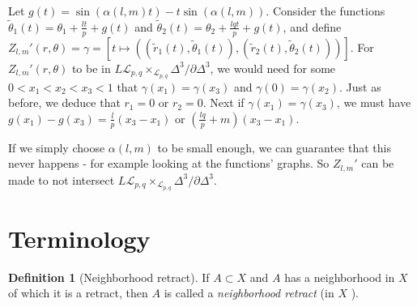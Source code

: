 \documentclass[reqno]{amsart}
\theoremstyle{definition}
\newtheorem{definition}[theorem]{Definition}
\theoremstyle{remark}
\begin{document}
    
    Let $g(t) = \sin\left( \alpha(l,m) t \right) -
    t \sin(\alpha(l,m))$.
    Consider the functions
    $\tilde{\theta}_1(t) =  
    \theta_1 + \frac{lt}{p}  + g(t)$ and
    $\tilde{\theta}_2 (t) = 
    \theta_2 + \frac{lqt}{p} + 
    g(t)$, and
    define $Z_{l,m}'(r, \theta) = 
    \gamma = 
    \left[ t\mapsto \left( \left( \tilde{r}_1(t), \tilde{\theta}_1 (t) \right) , 
    \left( \tilde{r}_2 (t) , \tilde{\theta}_2 (t) \right) \right) \right] $.
    For $Z_{l,m}'(r, \theta)$ to be in
    $L \mathcal{L}_{p,q} \times_{\mathcal{L}_{p,q}}
    \Delta^3 / \partial \Delta^3$, we would need
    for some $0 < x_1 < x_2 < x_3 < 1$ that
    $\gamma(x_1) = \gamma(x_3)$ and
    $\gamma(0) = \gamma(x_2)$. Just as before,
    we deduce that
    $r_1 = 0$ or $r_2 = 0$.
    Next if 
    $\gamma(x_1) = \gamma(x_3)$, we must have
    $g(x_1) - g(x_3) = 
    \frac{l}{p}(x_3- x_1)$ or
    $(\frac{lq}{p} + m)(x_3-x_1)$.

    If we simply choose $\alpha(l,m)$ to be small enough, we
    can guarantee that this never happens - for example
    looking at the functions' graphs.
    So $Z_{l,m}'$ can be made to not intersect
    $L \mathcal{L}_{p,q} \times_{\mathcal{L}_{p,q}} \Delta^3 / 
    \partial \Delta^3$.
    




    

































\newpage


\section{Terminology}\label{Section:Terminology}

\begin{definition}[Neighborhood retract]
    If $A \subset X$ and $A$ has a neighborhood in $X$ of
    which it is a retract, then $A$ is called
    a \textit{neighborhood retract} (in $X$ ).
\end{definition}
\end{document}
